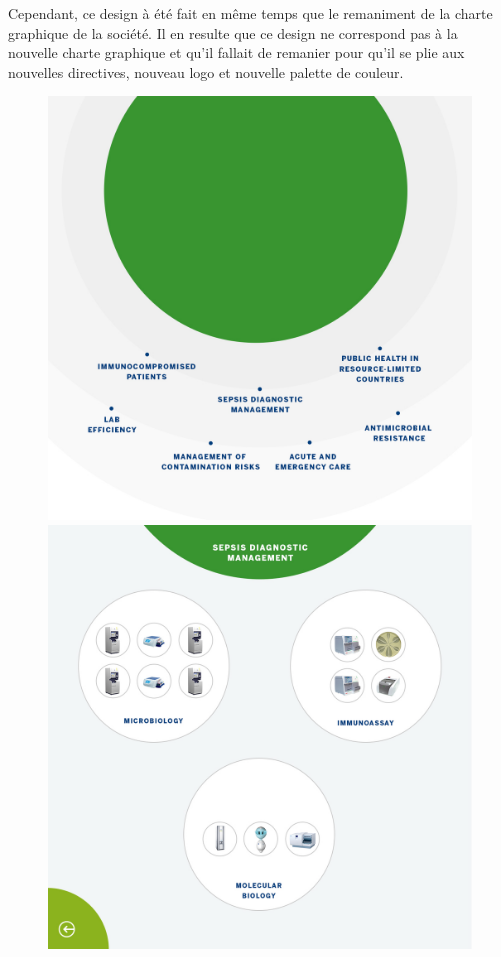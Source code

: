 \documentclass{article}
\begin{document}
Cependant, ce design à été fait en même temps que le remaniment de la charte graphique de la société.
Il en resulte que ce design ne correspond pas à la nouvelle charte graphique et qu'il fallait de remanier pour qu'il se plie aux nouvelles directives, nouveau logo et nouvelle palette de couleur.

\begin{figure}[h]
    \centering
    \includegraphics[scale=0.095]{bmx-1-new.jpg}
    \includegraphics[scale=0.095]{bmx-2-new.jpg}

\end{figure}
\end{document}
